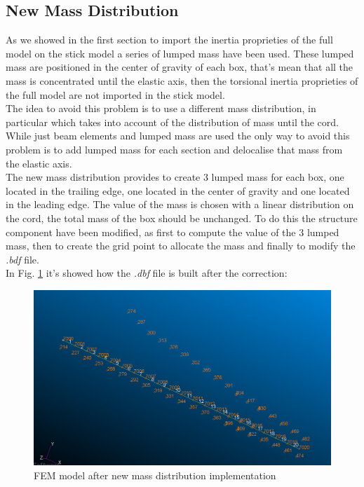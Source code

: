 \subsection{New Mass Distribution}
As we showed in the first section to import the inertia proprieties of the full model on the stick model a series of lumped mass have been used. These lumped mass are positioned in the center of gravity of each box, that's mean that all the mass is concentrated until the elastic axis, then the torsional inertia proprieties of the full model are not imported in the stick model.\\
The idea to avoid this problem is to use a different mass distribution, in particular which takes into account of the distribution of mass until the cord. While just beam elements and lumped mass are used the only way to avoid this problem is to add lumped mass for each section and delocalise that mass from the elastic axis. \\
The new mass distribution provides to create 3 lumped mass for each box, one located in the trailing edge, one located in the center of gravity and one located in the leading edge. The value of the mass is chosen with a linear distribution on the cord, the total mass of the box should be unchanged. To do this the structure component have been modified, as first to compute the value of the 3 lumped mass, then to create the grid point to allocate the mass and finally to modify the \textit{.bdf} file. \\
\newpage
In Fig. \ref{fig:4_10} it's showed how the \textit{.dbf} file is built after the correction:
\begin{figure}[H]
	\centering
	\includegraphics[width = 1\textwidth]{./Immagini/4_17.png}
	\caption{FEM model after new mass distribution implementation}
	\label{fig:4_10}
\end{figure}
